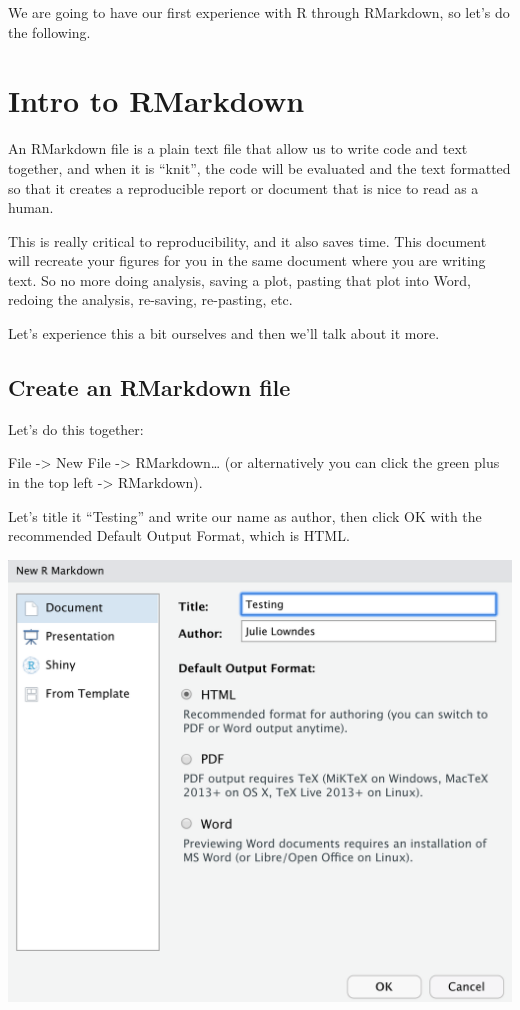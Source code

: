 \documentclass[]{book}
\begin{document}
We are going to have our first experience with R through RMarkdown, so let's do the following.

\hypertarget{intro-to-rmarkdown}{%
\section{Intro to RMarkdown}\label{intro-to-rmarkdown}}

An RMarkdown file is a plain text file that allow us to write code and text together, and when it is ``knit'', the code will be evaluated and the text formatted so that it creates a reproducible report or document that is nice to read as a human.

This is really critical to reproducibility, and it also saves time. This document will recreate your figures for you in the same document where you are writing text. So no more doing analysis, saving a plot, pasting that plot into Word, redoing the analysis, re-saving, re-pasting, etc.

Let's experience this a bit ourselves and then we'll talk about it more.

\hypertarget{create-an-rmarkdown-file}{%
\subsection{Create an RMarkdown file}\label{create-an-rmarkdown-file}}

Let's do this together:

File -\textgreater{} New File -\textgreater{} RMarkdown\ldots{} (or alternatively you can click the green plus in the top left -\textgreater{} RMarkdown).

Let's title it ``Testing'' and write our name as author, then click OK with the recommended Default Output Format, which is HTML.

\includegraphics[width=0.8\linewidth]{img/rstudio_new-rmd-doc-html}
\end{document}

